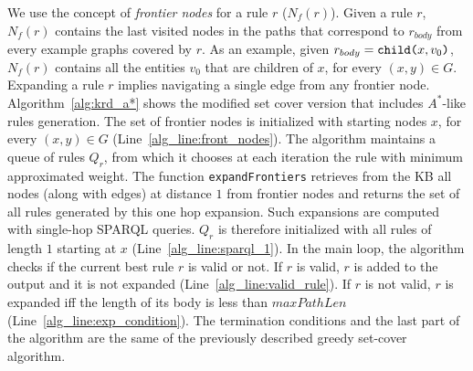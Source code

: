 We use the concept of \emph{frontier nodes} for a rule $r$ ($N_f(r)$). Given a rule $r$, $N_f(r)$ contains the last visited nodes in the paths that correspond to $r_{body}$ from every example graphs covered by $r$. As an example, given $r_{body} = \texttt{child(}x,v_0\texttt{)}$, $N_f(r)$ contains all the entities $v_0$ that are children of $x$, for every $(x,y) \in G$. 
Expanding a rule $r$ implies navigating a single edge from any frontier node. Algorithm~\ref{alg:krd_a*} shows the modified set cover version that includes $A^*$-like rules generation. The set of frontier nodes is initialized with starting nodes $x$, for every $(x,y) \in G$ (Line~\ref{alg_line:front_nodes}). The algorithm maintains a queue of rules $Q_r$, from which it chooses at each iteration the rule with minimum approximated weight. 
The function \texttt{expandFrontiers} retrieves from the KB all nodes (along with edges) at distance $1$ from frontier nodes and returns the set of all rules generated by this one hop expansion. Such expansions are computed with single-hop SPARQL queries. $Q_r$ is therefore initialized with all rules of length $1$ starting at $x$ (Line~\ref{alg_line:sparql_1}). In the main loop, the algorithm checks if the current best rule $r$ is valid or not. If $r$ is valid, $r$ is added to the output and it is not expanded (Line~\ref{alg_line:valid_rule}). If $r$ is not valid, $r$ is expanded iff the length of its body is less than $maxPathLen$ (Line~\ref{alg_line:exp_condition}). 
The termination conditions and the last part of the algorithm are the same of the previously described greedy set-cover algorithm. %

\setlength{\textfloatsep}{0pt}%

\setlength{\textfloatsep}{5pt}

